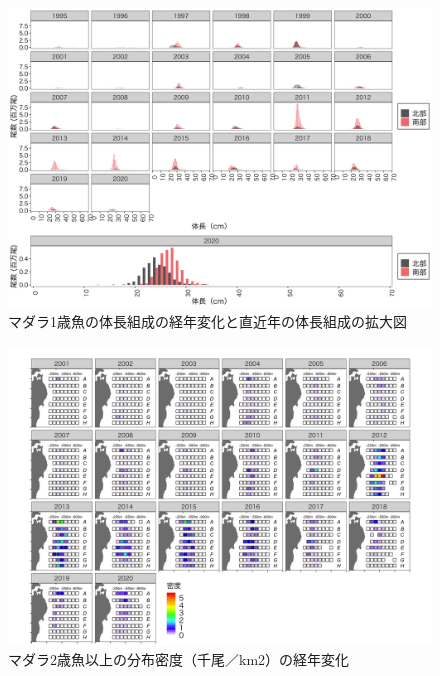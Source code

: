 \documentclass[11pt]{article} %
\begin{document}
\begin{linenumbers}
\begin{figure}[h]
  \centering
  \includegraphics[width = 14cm]{マダラ1+length.png}
  \caption{マダラ1歳魚の体長組成の経年変化と直近年の体長組成の拡大図}
\end{figure}

\begin{figure}[h]
  \centering
  \includegraphics[width = 14cm]{マダラ２＋dens.png}
  \caption{マダラ2歳魚以上の分布密度（千尾／km2）の経年変化}
\end{figure}


\end{linenumbers}
\end{document}

